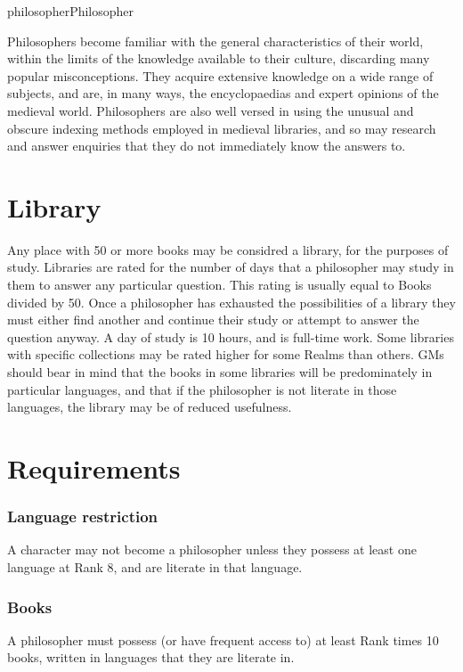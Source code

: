 \begin{Skill}[2.0]{philosopher}{Philosopher}

Philosophers become familiar with the general characteristics of their
world, within the limits of the knowledge available to their culture,
discarding many popular misconceptions. They acquire extensive
knowledge on a wide range of subjects, and are, in many ways, the
encyclopaedias and expert opinions of the medieval world.
Philosophers are also well versed in using the unusual and obscure
indexing methods employed in medieval libraries, and so may research
and answer enquiries that they do not immediately know the answers to.

\section{Library}
Any place with 50 or more books may be considred a library, for the
purposes of study.  Libraries are rated for the number of days that a
philosopher may study in them to answer any particular question. This
rating is usually equal to Books divided by 50. Once a philosopher has
exhausted the possibilities of a library they must either find another
and continue their study or attempt to answer the question anyway. A
day of study is 10 hours, and is full-time work. Some libraries with
specific collections may be rated higher for some Realms than
others. GMs should bear in mind that the books in some libraries will
be predominately in particular languages, and that if the philosopher
is not literate in those languages, the library may be of reduced
usefulness.

\section{Requirements}

\subsubsection{Language restriction}

A character may not become a philosopher unless they possess at least
one language at Rank 8, and are literate in that language.

\subsubsection{Books}

A philosopher must possess (or have frequent access to) at least Rank
times 10 books, written in languages that they are literate in.


\end{Skill}
